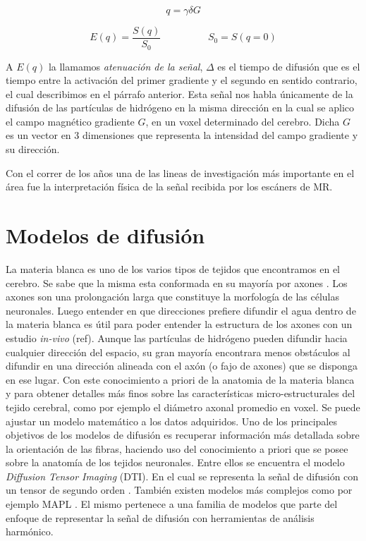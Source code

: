 \documentclass[11pt,a4paper,twoside]{tesis}
\begin{document}
\begin{equation} 
\label{eq:3}
 q = \gamma \delta G
\end{equation}

\begin{equation} 
\label{eq:2}
E(q) = \frac{S(q)}{S_0} \hspace{2cm} S_0=S(q=0)
\end{equation}


A $E(q)$ la llamamos \textit{atenuaci\'on de la señal},  
$\Delta$ es el tiempo de difusión que es el tiempo entre la activación del primer gradiente y el segundo en 
sentido contrario, el cual describimos en el párrafo anterior. Esta señal nos 
habla \'unicamente de la difusi\'on de las part\'iculas de hidr\'ogeno en la misma 
direcci\'on en la cual se aplico el campo magn\'etico gradiente $G$, en un voxel determinado del 
cerebro. Dicha $G$ es un vector en 3 dimensiones que representa la intensidad 
del campo gradiente y su direcci\'on.


Con el correr de los años una de las lineas de investigación más 
importante en el \'area fue la interpretaci\'on f\'isica de la se\~nal recibida 
por los escáners de MR.  



\section{Modelos de difusi\'on}
La materia blanca es uno de los varios tipos de tejidos que encontramos en el cerebro. Se sabe que 
la misma esta conformada en su mayor\'ia por axones \citep{Purves2004}. Los axones son una 
prolongaci\'on larga que constituye la morfolog\'ia de las c\'elulas neuronales. 
Luego entender en que direcciones prefiere difundir el agua dentro de la materia 
blanca es \'util para poder entender la estructura de los axones con un estudio \textit{in-vivo} 
(ref). Aunque las part\'iculas de hidr\'ogeno pueden difundir hacia cualquier 
direcci\'on del espacio, su gran mayor\'ia encontrara menos obst\'aculos al difundir en una 
direcci\'on alineada con el ax\'on (o fajo de axones) que se disponga en ese lugar. Con este 
conocimiento a priori de la anatomia de la materia blanca y para obtener detalles más finos sobre 
las características micro-estructurales del tejido cerebral, como por ejemplo el diámetro axonal 
promedio en voxel. Se puede ajustar un modelo matemático a los datos adquiridos. Uno de los 
principales objetivos de los modelos de difusión es recuperar información más detallada sobre la 
orientación de las fibras, haciendo uso del conocimiento a priori que se posee sobre la anatomía de 
los tejidos neuronales. Entre ellos se encuentra el modelo \textit{Diffusion Tensor Imaging} (DTI). 
En el cual se representa la se\~nal de difusión con un tensor de segundo orden \citep{Basser1994}. 
También existen modelos más complejos como por ejemplo MAPL \citep{Fick2016365}. El mismo pertenece 
a una familia de modelos que parte del enfoque de representar la señal de difusión con 
herramientas de análisis harmónico.
\end{document}
